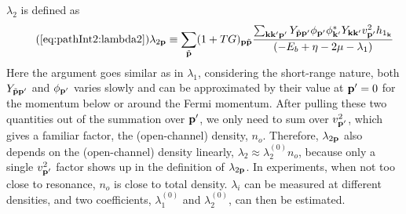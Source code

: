  $\lambda_2$ is defined as
\begin{equation}\tag{\ref{eq:pathInt2:lambda2}}
\lambda_{2\vp}\equiv\sum_{\tilde\vp}(1+TG)_{\vp\tilde\vp}\frac{\sum_{\vk\vk{'}\vp'} Y_{\tilde\vp\vp'}{\phi_{\vp'}}{\phi_{\vk'}^{*}}{Y_{\vk\vk'}}v_{\vp'}^{2}{h_{1_{\vk}}}}
		{\br{-E_{b}+\eta-2\mu-\lambda_{1}}}{}
\end{equation}
Here the argument goes similar as in $\lambda_{1}$, considering the short-range nature, both  $Y_{\tilde{\mathbf{p}}\mathbf{p}'}$ and $\phi_{\mathbf{p}'}$ varies slowly and can be approximated by their value at $\mathbf{p}'=0$ for the momentum below or around the Fermi momentum.  After pulling these two quantities out of the summation over $\mathbf{p}'$, we only need to sum over   $v_{\mathbf{p}'}^{2}$, which gives a familiar factor,  the (open-channel) density, $n_{o}$. Therefore,  $\lambda_{2\mathbf{p}}$ also depends on the (open-channel) density linearly, $\lambda_2\approx\lambda_2^{(0)}n_{o}$,  because only a single $v_{\mathbf{p}'}^2$ factor shows up  in the definition of $\lambda_{2\mathbf{p}}$.  In experiments, when not too close to resonance, $n_o$ is close to total density.  $\lambda_{i}$ can be measured at different densities,  and two coefficients, $\lambda_{1}^{(0)}$  and $\lambda_{2}^{(0)}$, can then be estimated. 





